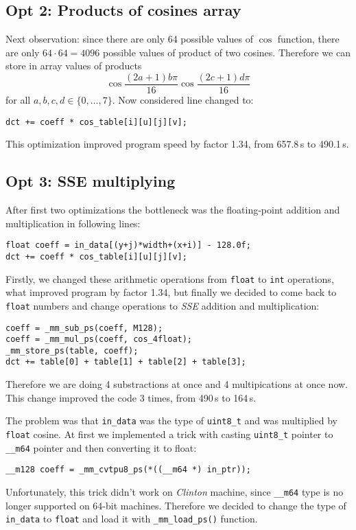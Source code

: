 \documentclass[11pt]{article}
\begin{document}
\subsection{Opt 2: Products of cosines array}
Next observation: since there are only 64 possible values of $\cos$ function,
there are only $64 \cdot 64 = 4096$ possible values of product of two cosines.
Therefore we can store in array values of products
$$\cos \frac{(2a + 1) b \pi}{16}
\cos \frac{(2c + 1) d \pi}{16}$$
for all $a, b, c, d \in \{0, \ldots, 7 \}$.
Now considered line changed to:
\begin{lstlisting}
dct += coeff * cos_table[i][u][j][v];
\end{lstlisting}
This optimization improved program speed by factor 1.34, from 657.8\,s to 490.1\,s.

\subsection{Opt 3: SSE multiplying}
After first two optimizations the bottleneck was the floating-point addition and multiplication in following lines:
\begin{lstlisting}
float coeff = in_data[(y+j)*width+(x+i)] - 128.0f;
dct += coeff * cos_table[i][u][j][v];
\end{lstlisting}
Firstly, we changed these arithmetic operations from \texttt{float} to \texttt{int} operations, what improved program by factor 1.34, 
but finally we decided to come back to \texttt{float} numbers and change operations to \emph{SSE} addition and multiplication:
\begin{lstlisting}
coeff = _mm_sub_ps(coeff, M128);
coeff = _mm_mul_ps(coeff, cos_4float);
_mm_store_ps(table, coeff);
dct += table[0] + table[1] + table[2] + table[3];
\end{lstlisting}
Therefore we are doing 4 substractions at once and 4 multipications at once now.
This change improved the code 3 times, from 490\,s to 164\,s.

The problem was that \texttt{in\_data} was the type of \texttt{uint8\_t}
and was multiplied by \texttt{float} cosine.
At first we implemented a trick with casting \texttt{uint8\_t} pointer
to \texttt{\_\_m64} pointer and then converting it to float:
\begin{lstlisting}
__m128 coeff = _mm_cvtpu8_ps(*((__m64 *) in_ptr));
\end{lstlisting}
Unfortunately, this trick didn't work on \emph{Clinton} machine, 
since \texttt{\_\_m64} type is no longer supported on 64-bit machines.
Therefore we decided to change the type of \texttt{in\_data} to \texttt{float}
and load it with \texttt{\_mm\_load\_ps()} function.
\end{document}
